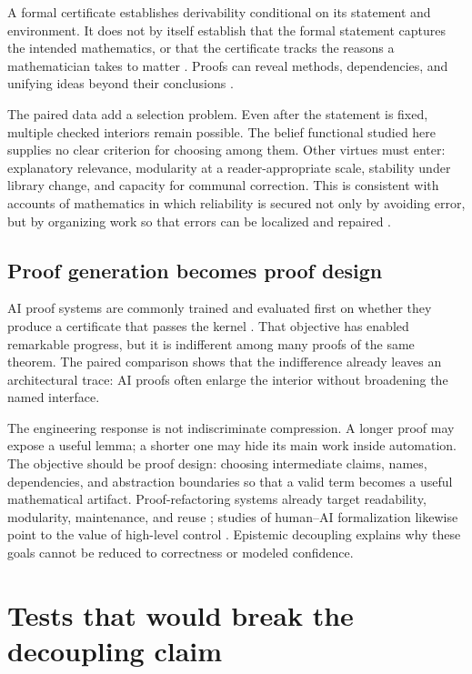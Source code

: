 \documentclass[11pt]{article}
\begin{document}
A formal certificate establishes derivability conditional on its statement and environment.  It
does not by itself establish that the formal statement captures the intended mathematics, or that
the certificate tracks the reasons a mathematician takes to matter
\citep{dedeo2026correspondence}.  Proofs can reveal methods, dependencies, and unifying ideas beyond
their conclusions \citep{rav1999,mancosu2008}.

The paired data add a selection problem.  Even after the statement is fixed, multiple checked
interiors remain possible.  The belief functional studied here supplies no clear criterion for
choosing among them.  Other
virtues must enter: explanatory relevance, modularity at a reader-appropriate scale, stability under
library change, and capacity for communal correction.  This is consistent with accounts of
mathematics in which reliability is secured not only by avoiding error, but by organizing work so
that errors can be localized and repaired \citep{avigad2020reliability,detoffoli2021}.

\subsection{Proof generation becomes proof design}

AI proof systems are commonly trained and evaluated first on whether they produce a certificate
that passes the kernel \citep{yang2023,ren2025}.  That objective has enabled remarkable progress,
but it is indifferent
among many proofs of the same theorem.  The
paired comparison shows that the indifference already leaves an architectural trace: AI proofs
often enlarge the interior without broadening the named interface.

The engineering response is not indiscriminate compression.  A longer proof may expose a useful
lemma; a shorter one may hide its main work inside automation.  The objective should be proof
design: choosing intermediate claims, names, dependencies, and abstraction boundaries so that a
valid term becomes a useful mathematical artifact.  Proof-refactoring systems already target
readability, modularity, maintenance, and reuse \citep{fu2026refactor}; studies of human--AI
formalization likewise point to the value of high-level control \citep{collins2026workflows}.
Epistemic decoupling explains why these goals cannot be reduced to correctness or modeled confidence.

\section{Tests that would break the decoupling claim}
\end{document}
